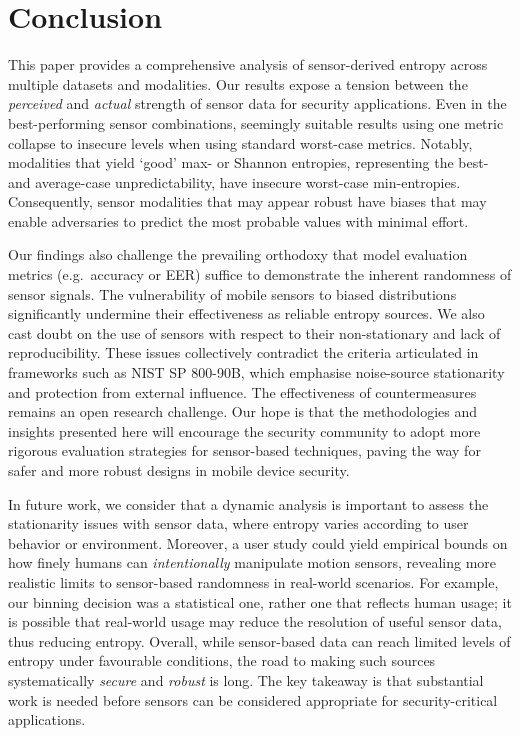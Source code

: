 \section{Conclusion}
\label{sec:conc}
This paper provides a comprehensive analysis of sensor-derived entropy across multiple datasets and modalities. Our results expose a tension between the \emph{perceived} and \emph{actual} strength of sensor data for security applications. Even in the best-performing sensor combinations, seemingly suitable results using one metric collapse to insecure levels when using standard worst-case metrics. Notably, modalities that yield `good' max- or Shannon entropies, representing the best- and average-case unpredictability, have insecure worst-case min-entropies.  Consequently, sensor modalities that may appear robust have biases that may enable adversaries to predict the most probable values with minimal effort. 

Our findings also challenge the prevailing orthodoxy that model evaluation metrics (e.g.\ accuracy or EER) suffice to demonstrate the inherent randomness of sensor signals. The vulnerability of mobile sensors to biased distributions significantly undermine their effectiveness as reliable entropy sources. We also cast doubt on the use of sensors with respect to their non-stationary and lack of reproducibility. These issues collectively contradict the criteria articulated in frameworks such as NIST SP 800-90B, which emphasise noise-source stationarity and protection from external influence. The effectiveness of countermeasures remains an open research challenge. Our hope is that the methodologies and insights presented here will encourage the security community to adopt more rigorous evaluation strategies for sensor-based techniques, paving the way for safer and more robust designs in mobile device security.


In future work, we consider that a dynamic analysis is important to assess the stationarity issues with sensor data, where entropy varies according to user behavior or environment. Moreover, a user study could yield empirical bounds on how finely humans can \emph{intentionally} manipulate motion sensors, revealing more realistic limits to sensor-based randomness in real-world scenarios. For example, our binning decision was a statistical one, rather one that reflects human usage; it is possible that real-world usage may reduce the resolution of useful sensor data, thus reducing entropy. Overall, while sensor-based data can reach limited levels of entropy under favourable conditions, the road to making such sources systematically \emph{secure}  and \emph{robust} is long. The key takeaway is that substantial work is needed before sensors can be considered appropriate for security-critical applications.